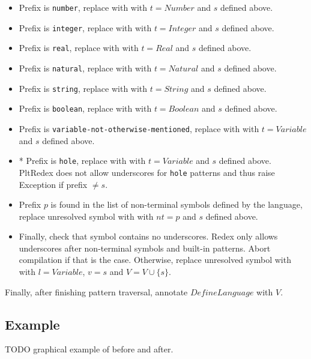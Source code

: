 \begin{itemize}
\item
Prefix is \texttt{number}, replace \UnresolvedSymbol with  \BuiltInPattern with $t=Number$ and $s$ defined above.

\item
Prefix is \texttt{integer}, replace \UnresolvedSymbol with  \BuiltInPattern with $t=Integer$ and $s$ defined above.

\item
Prefix is \texttt{real}, replace \UnresolvedSymbol with  \BuiltInPattern with $t=Real$ and $s$ defined above.

\item
Prefix is \texttt{natural}, replace \UnresolvedSymbol with  \BuiltInPattern with $t=Natural$ and $s$ defined above.

\item
Prefix is \texttt{string}, replace \UnresolvedSymbol with  \BuiltInPattern with $t=String$ and $s$ defined above.

\item
Prefix is \texttt{boolean}, replace \UnresolvedSymbol with  \BuiltInPattern with $t=Boolean$ and $s$ defined above.

\item
Prefix is \texttt{variable-not-otherwise-mentioned}, replace \UnresolvedSymbol with  \BuiltInPattern with $t=Variable$ and $s$ defined above.

\item
* Prefix is \texttt{hole}, replace \UnresolvedSymbol with  \BuiltInPattern with $t=Variable$ and $s$ defined above. PltRedex does not allow underscores for \texttt{hole} patterns and thus raise Exception if prefix $\neq s$.

\item
Prefix $p$ is found in the list of non-terminal symbols defined by the language, replace unresolved symbol with \Nt with $nt=p$ and $s$ defined above.

\item
Finally, check that symbol contains no underscores. Redex only allows underscores after non-terminal symbols and built-in patterns. Abort compilation if that is the case. Otherwise, replace unresolved symbol with \LiteralPattern with $l=Variable$, $v=s$ and $V = V \cup \{s\}$.

\end{itemize}

Finally, after finishing pattern traversal, annotate $DefineLanguage$ with $V$.

\subsection{Example}
TODO graphical example of before and after.
